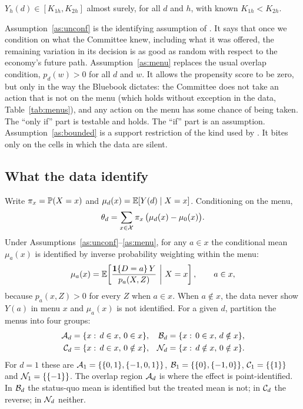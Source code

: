 \begin{assumption}\label{as:bounded}
$Y_{h}(d)\in[K_{1h},K_{2h}]$ almost surely, for all $d$ and $h$, with known $K_{1h}<K_{2h}$.
\end{assumption}

Assumption~\ref{as:unconf} is the identifying assumption of \citet{angrist2018}. It says that once we condition
on what the Committee knew, including what it was offered, the remaining variation in its decision is as good as
random with respect to the economy's future path. Assumption~\ref{as:menu} replaces the usual overlap condition,
$p_d(w)>0$ for all $d$ and $w$. It allows the propensity score to be zero, but only in the way the Bluebook
dictates: the Committee does not take an action that is not on the menu (which holds without exception in the
data, Table~\ref{tab:menus}), and any action on the menu has some chance of being taken. The ``only if'' part is
testable and holds. The ``if'' part is an assumption. Assumption~\ref{as:bounded} is a support restriction of
the kind used by \citet{manski1990}. It bites only on the cells in which the data are silent.

\subsection{What the data identify}

Write $\pi_x=\mathbb{P}(X=x)$ and $\mu_d(x)=\operatorname{\mathbb{E}}[Y(d)\mid X=x]$. Conditioning on the menu,
\begin{equation}\label{eq:decomp}
  \theta_d=\sum_{x\in\mathcal{X}}\pi_x\,\bigl(\mu_d(x)-\mu_0(x)\bigr).
\end{equation}
Under Assumptions~\ref{as:unconf}--\ref{as:menu}, for any $a\in x$ the conditional mean $\mu_a(x)$ is identified by
inverse probability weighting within the menu:
\begin{equation}\label{eq:ipw}
  \mu_a(x)=\E\!\left[\frac{\1\{D=a\}\,Y}{p_a(X,Z)}\ \middle|\ X=x\right],\qquad a\in x,
\end{equation}
because $p_a(x,Z)>0$ for every $Z$ when $a\in x$. When $a\notin x$, the data never show $Y(a)$ in menu $x$ and
$\mu_a(x)$ is not identified. For a given $d$, partition the menus into four groups:
\begin{align*}
\mathcal{A}_d&=\{x:\,d\in x,\,0\in x\}, & \mathcal{B}_d&=\{x:\,0\in x,\,d\notin x\},\\
\mathcal{C}_d&=\{x:\,d\in x,\,0\notin x\}, & \mathcal{N}_d&=\{x:\,d\notin x,\,0\notin x\}.
\end{align*}
For $d=1$ these are $\mathcal{A}_1=\{\{0,1\},\{-1,0,1\}\}$, $\mathcal{B}_1=\{\{0\},\{-1,0\}\}$, $\mathcal{C}_1=\{\{1\}\}$ and
$\mathcal{N}_1=\{\{-1\}\}$. The overlap region $\mathcal{A}_d$ is where the effect is point-identified. In $\mathcal{B}_d$ the status-quo mean
is identified but the treated mean is not; in $\mathcal{C}_d$ the reverse; in $\mathcal{N}_d$ neither.

